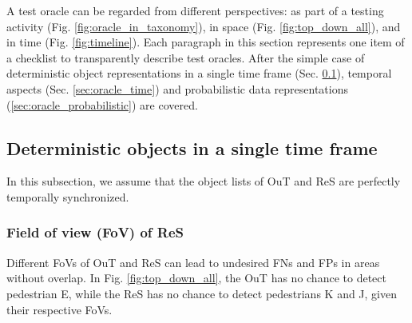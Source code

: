 \documentclass[conference]{IEEEtran}
\begin{document}
A test oracle can be regarded from different perspectives: as part of a testing activity (Fig. \ref{fig:oracle_in_taxonomy}), in space (Fig. \ref{fig:top_down_all}), and in time (Fig. \ref{fig:timeline}).
Each paragraph in this section represents one item of a checklist to transparently describe test oracles. 
After the simple case of deterministic object representations in a single time frame (Sec. \ref{sec:oracle_simple}), temporal aspects (Sec. \ref{sec:oracle_time}) and probabilistic data representations (\ref{sec:oracle_probabilistic}) are covered.



\subsection{Deterministic objects in a single time frame}
\label{sec:oracle_simple}

In this subsection, we assume that the object lists of OuT and ReS are perfectly temporally synchronized. 

\subsubsection{Field of view (FoV) of ReS}
\label{sec:basic_fov_ref}
Different FoVs of OuT and ReS can lead to undesired FNs and FPs in areas without overlap.
In Fig. \ref{fig:top_down_all}, the OuT has no chance to detect pedestrian E, while the ReS has no chance to detect pedestrians K and J, given their respective FoVs. 
\end{document}
